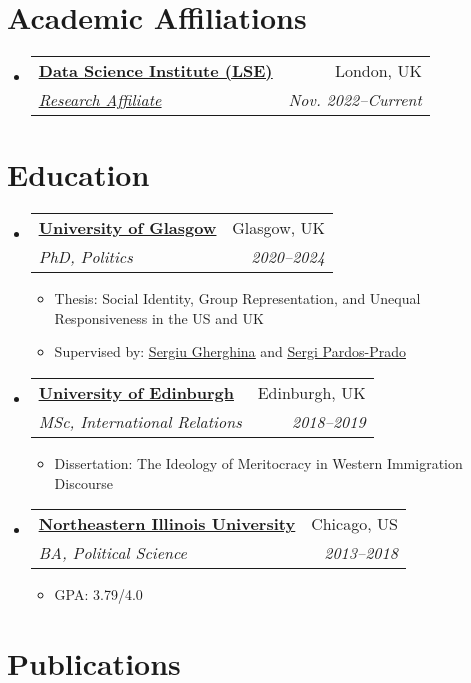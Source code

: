 \documentclass[letterpaper,11pt]{article}
\makeatletter
\newcommand{\resumeItem}[1]{
  \item\small{
    {#1 \vspace{-2pt}}
  }
}
\newcommand{\resumeSubheading}[4]{
  \vspace{-2pt}\item
    \begin{tabular*}{0.97\textwidth}[t]{l@{\extracolsep{\fill}}r}
      \textbf{#1} & #2 \\
      \textit{\small#3} & \textit{\small #4} \\
    \end{tabular*}\vspace{-7pt}
}
\newcommand{\resumeSubHeadingListStart}{\begin{itemize}[leftmargin=0.15in, label={}]}
\newcommand{\resumeSubHeadingListEnd}{\end{itemize}}
\newcommand{\resumeItemListStart}{\begin{itemize}}
\newcommand{\resumeItemListEnd}{\end{itemize}\vspace{-5pt}}
\makeatother
\begin{document}
\section{Academic Affiliations}
  \resumeSubHeadingListStart
    \resumeSubheading
      {\href{https://www.lse.ac.uk/DSI}{\ul{Data Science Institute (LSE)}}}{London, UK}
      {\href{https://www.lse.ac.uk/DSI/People}{\ul{Research Affiliate}}}{Nov. 2022--Current}
 \resumeSubHeadingListEnd

\section{Education}
  \resumeSubHeadingListStart
    \resumeSubheading
      {\href{https://www.gla.ac.uk/}{\ul{University of Glasgow}}}{Glasgow, UK}
      {PhD, Politics}{2020--2024}
          \resumeItemListStart
            \resumeItem{Thesis: Social Identity, Group Representation, and Unequal Responsiveness in the US and UK}
            \resumeItem{Supervised by: \href{https://www.gla.ac.uk/schools/socialpolitical/staff/sergiugherghina/}{\ul{Sergiu Gherghina}} and \href{https://www.sergipardos.com/}{\ul{Sergi Pardos-Prado}}}
        \resumeItemListEnd
    \resumeSubheading
      {\href{https://www.ed.ac.uk/}{\ul{University of Edinburgh}}}{Edinburgh, UK}
      {MSc, International Relations}{2018--2019}
          \resumeItemListStart
            \resumeItem{Dissertation: The Ideology of Meritocracy in Western Immigration Discourse}
        \resumeItemListEnd
    \resumeSubheading
      {\href{https://www.neiu.edu/}{\ul{Northeastern Illinois University}}}{Chicago, US}
      {BA, Political Science}{2013--2018}
        \resumeItemListStart
            \resumeItem{GPA: 3.79/4.0}
        \resumeItemListEnd

  \resumeSubHeadingListEnd


  \section{Publications}
\end{document}
